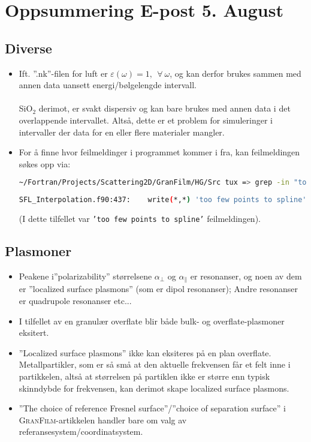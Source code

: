 \section{Oppsummering E-post 5. August}
\subsection{Diverse}
\begin{itemize}
   \item Ift. ''.nk''-filen for luft er $\varepsilon(\omega)=1,\:\: \forall \: \omega$, og kan derfor brukes sammen med 
      annen data uansett energi/bølgelengde intervall.
      \\
      \\
      SiO$_2$ derimot, er svakt dispersiv og kan bare brukes med annen data i det overlappende intervallet.
      Altså, dette er et problem for simuleringer i intervaller der data for en eller flere materialer
      mangler.

   \item For å finne hvor feilmeldinger i programmet kommer i fra, kan feilmeldingen søkes opp
      via:
\begin{lstlisting}[style=FormattedNumber,frame=none, language=bash]
~/Fortran/Projects/Scattering2D/GranFilm/HG/Src tux => grep -in "too few points to spline" *.f90
\end{lstlisting}
\begin{lstlisting}[style=FormattedNumber,frame=none, language=bash]
      SFL_Interpolation.f90:437:    write(*,*) 'too few points to spline'
\end{lstlisting}
(I dette tilfellet var \texttt{'too few points to spline'} feilmeldingen).

\end{itemize}

\subsection{Plasmoner}
\begin{itemize}
   \item Peakene i''polarizability'' størrelsene $\alpha_{\perp}$ og $\alpha_{\parallel}$ er resonanser, og noen av dem er
      ''localized surface plasmons'' (som er dipol resonanser); Andre resonanser er quadrupole resonanser etc...
   \item I tilfellet av en granulær overflate blir både bulk- og overflate-plasmoner eksitert.
   \item ''Localized surface plasmons'' ikke kan eksiteres på en plan overflate. Metallpartikler, som
      er så små at den aktuelle frekvensen får et felt inne i partikkelen, altså at størrelsen på partiklen ikke er større
      enn typisk skinndybde for frekvensen, kan derimot skape localized surface plasmons.
   \item ''The choice of reference Fresnel surface''/''choice of separation surface'' i \textsc{GranFilm}-artikkelen handler bare om
      valg av referansesystem/coordinatsystem.

\end{itemize}

